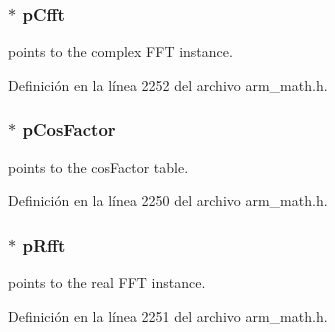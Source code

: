 \subsubsection[{\texorpdfstring{p\+Cfft}{pCfft}}]{$\ast$ p\+Cfft}\hypertarget{structarm__dct4__instance__f32_ab7bd4d374a1780dea50efd3e7ac220be}{}\label{structarm__dct4__instance__f32_ab7bd4d374a1780dea50efd3e7ac220be}
points to the complex F\+FT instance. 

Definición en la línea 2252 del archivo arm\+\_\+math.\+h.

\subsubsection[{\texorpdfstring{p\+Cos\+Factor}{pCosFactor}}]{$\ast$ p\+Cos\+Factor}\hypertarget{structarm__dct4__instance__f32_abd73b9d7fb4951ba086e4820c2a48eb0}{}\label{structarm__dct4__instance__f32_abd73b9d7fb4951ba086e4820c2a48eb0}
points to the cos\+Factor table. 

Definición en la línea 2250 del archivo arm\+\_\+math.\+h.

\subsubsection[{\texorpdfstring{p\+Rfft}{pRfft}}]{$\ast$ p\+Rfft}\hypertarget{structarm__dct4__instance__f32_ad4cd7c85eea3f7c5fff4630bbd979e6a}{}\label{structarm__dct4__instance__f32_ad4cd7c85eea3f7c5fff4630bbd979e6a}
points to the real F\+FT instance. 

Definición en la línea 2251 del archivo arm\+\_\+math.\+h.

